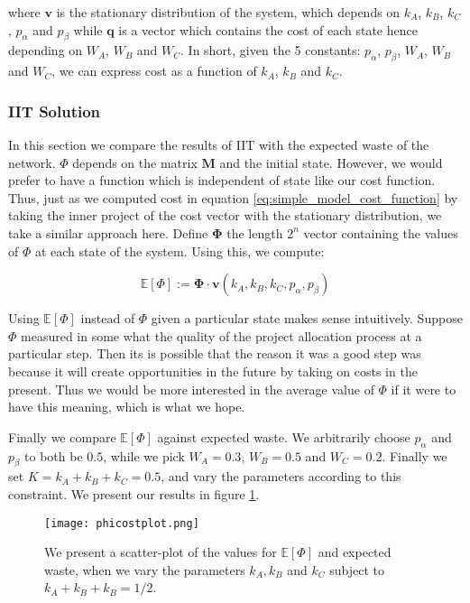 where $\mathbf{v}$ is the stationary distribution of the system, which depends on $k_A$, $k_B$, $k_C$, $p_\alpha$ and $p_\beta$ while $\mathbf{q}$ is a vector which contains the cost of each state hence depending on $W_A$, $W_B$ and $W_C$. In short, given the 5 constants: $p_\alpha$, $p_\beta$, $W_A$, $W_B$ and $W_C$, we can express cost as a function of $k_A$, $k_B$ and $k_C$. 

\subsubsection{IIT Solution}

In this section we compare the results of IIT with the expected waste of the network. $\Phi$ depends on the matrix $\mathbf{M}$ and the initial state. However, we would prefer to have a function which is independent of state like our cost function. Thus, just as we computed cost in equation \ref{eq:simple_model_cost_function} by taking the inner project of the cost vector with the stationary distribution, we take a similar approach here.
Define $\mathbf{\Phi}$ the length $2^n$ vector containing the values of $\Phi$ at each state of the system. Using this, we compute:

\begin{equation}
\mathbb{E}[\Phi]:= \mathbf{\Phi}\cdot \mathbf{v}(k_A, k_B, k_C, p_\alpha, p_\beta)
\end{equation}

Using $\mathbb{E}[\Phi]$ instead of $\Phi$ given a particular state makes sense intuitively. Suppose $\Phi$ measured in some what the quality of the project allocation process at a particular step. Then its is possible that the reason it was a good step was because it will create opportunities in the future by taking on costs in the present. Thus we would be more interested in the average value of $\Phi$ if it were to have this meaning, which is what we hope.

Finally we compare $\mathbb{E}[\Phi]$ against expected waste. We arbitrarily choose $p_\alpha$ and $p_\beta$ to both be $0.5$, while we pick $W_A=0.3$, $W_B = 0.5$ and $W_C = 0.2$. Finally we set $K = k_A+k_B+k_C = 0.5$, and vary the parameters according to this constraint. We present our results in figure \ref{fig:simple_model_phi_cost_plot}.

\begin{figure}[!ht]
	\centering
	\texttt{[image: phicostplot.png]}
	\caption{We present a scatter-plot of the values for $\mathbb{E}[\Phi]$ and expected waste, when we vary the parameters $k_A, k_B$ and $k_C$ subject to $k_A+k_B+k_B=1/2$.}
	\label{fig:simple_model_phi_cost_plot}
\end{figure}

